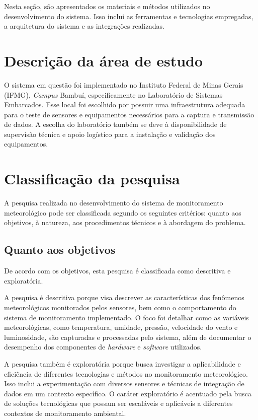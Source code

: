 Nesta seção, são apresentados os materiais e métodos utilizados no desenvolvimento do sistema. Isso inclui as ferramentas e tecnologias empregadas, a arquitetura do sistema e as integrações realizadas.

\section{Descrição da área de estudo}
O sistema em questão foi implementado no Instituto Federal de Minas Gerais (IFMG), \textit{Campus} Bambuí, especificamente no Laboratório de Sistemas Embarcados. Esse local foi escolhido por possuir uma infraestrutura adequada para o teste de sensores e equipamentos necessários para a captura e transmissão de dados. A escolha do laboratório também se deve à disponibilidade de supervisão técnica e apoio logístico para a instalação e validação dos equipamentos.

\section{Classificação da pesquisa}

A pesquisa realizada no desenvolvimento do sistema de monitoramento meteorológico pode ser classificada segundo os seguintes critérios: quanto aos objetivos, à natureza, aos procedimentos técnicos e à abordagem do problema.

\subsection{Quanto aos objetivos}

De acordo com os objetivos, esta pesquisa é classificada como descritiva e exploratória. 

A pesquisa é descritiva porque visa descrever as características dos fenômenos meteorológicos monitorados pelos sensores, bem como o comportamento do sistema de monitoramento implementado. O foco foi detalhar como as variáveis meteorológicas, como temperatura, umidade, pressão, velocidade do vento e luminosidade, são capturadas e processadas pelo sistema, além de documentar o desempenho dos componentes de \textit{hardware} e \textit{software} utilizados.

A pesquisa também é exploratória porque busca investigar a aplicabilidade e eficiência de diferentes tecnologias e métodos no monitoramento meteorológico. Isso inclui a experimentação com diversos sensores e técnicas de integração de dados em um contexto específico. O caráter exploratório é acentuado pela busca de soluções tecnológicas que possam ser escaláveis e aplicáveis a diferentes contextos de monitoramento ambiental.

